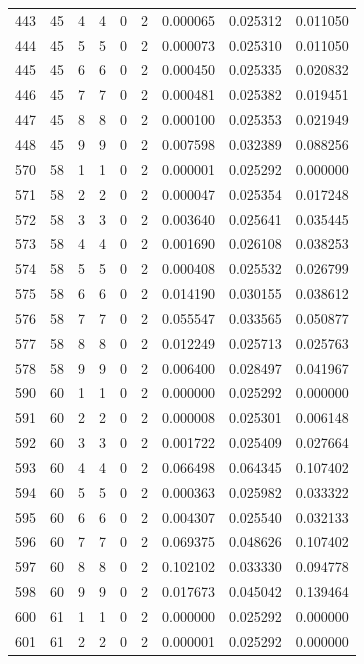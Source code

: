 \begin{longtable}{rrrrrrrrr}
443 & 45 & 4 & 4 & 0 & 2 & 0.000065 & 0.025312 & 0.011050 \\
444 & 45 & 5 & 5 & 0 & 2 & 0.000073 & 0.025310 & 0.011050 \\
445 & 45 & 6 & 6 & 0 & 2 & 0.000450 & 0.025335 & 0.020832 \\
446 & 45 & 7 & 7 & 0 & 2 & 0.000481 & 0.025382 & 0.019451 \\
447 & 45 & 8 & 8 & 0 & 2 & 0.000100 & 0.025353 & 0.021949 \\
448 & 45 & 9 & 9 & 0 & 2 & 0.007598 & 0.032389 & 0.088256 \\
570 & 58 & 1 & 1 & 0 & 2 & 0.000001 & 0.025292 & 0.000000 \\
571 & 58 & 2 & 2 & 0 & 2 & 0.000047 & 0.025354 & 0.017248 \\
572 & 58 & 3 & 3 & 0 & 2 & 0.003640 & 0.025641 & 0.035445 \\
573 & 58 & 4 & 4 & 0 & 2 & 0.001690 & 0.026108 & 0.038253 \\
574 & 58 & 5 & 5 & 0 & 2 & 0.000408 & 0.025532 & 0.026799 \\
575 & 58 & 6 & 6 & 0 & 2 & 0.014190 & 0.030155 & 0.038612 \\
576 & 58 & 7 & 7 & 0 & 2 & 0.055547 & 0.033565 & 0.050877 \\
577 & 58 & 8 & 8 & 0 & 2 & 0.012249 & 0.025713 & 0.025763 \\
578 & 58 & 9 & 9 & 0 & 2 & 0.006400 & 0.028497 & 0.041967 \\
590 & 60 & 1 & 1 & 0 & 2 & 0.000000 & 0.025292 & 0.000000 \\
591 & 60 & 2 & 2 & 0 & 2 & 0.000008 & 0.025301 & 0.006148 \\
592 & 60 & 3 & 3 & 0 & 2 & 0.001722 & 0.025409 & 0.027664 \\
593 & 60 & 4 & 4 & 0 & 2 & 0.066498 & 0.064345 & 0.107402 \\
594 & 60 & 5 & 5 & 0 & 2 & 0.000363 & 0.025982 & 0.033322 \\
595 & 60 & 6 & 6 & 0 & 2 & 0.004307 & 0.025540 & 0.032133 \\
596 & 60 & 7 & 7 & 0 & 2 & 0.069375 & 0.048626 & 0.107402 \\
597 & 60 & 8 & 8 & 0 & 2 & 0.102102 & 0.033330 & 0.094778 \\
598 & 60 & 9 & 9 & 0 & 2 & 0.017673 & 0.045042 & 0.139464 \\
600 & 61 & 1 & 1 & 0 & 2 & 0.000000 & 0.025292 & 0.000000 \\
601 & 61 & 2 & 2 & 0 & 2 & 0.000001 & 0.025292 & 0.000000 \\

\end{longtable}
